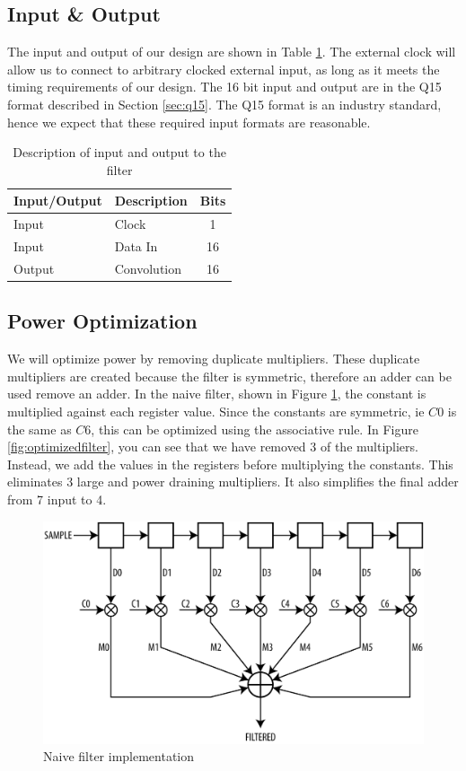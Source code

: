 \subsection{Input \& Output}
The input and output of our design are shown in Table \ref{table:inputoutput}.  The external clock will allow us to connect to arbitrary clocked external input, as long as it meets the timing requirements of our design.  The 16 bit input and output are in the Q15 format described in Section \ref{sec:q15}.  The Q15 format is an industry standard, hence we expect that these required input formats are reasonable.

\begin{table}[ht]
\centering
\begin{tabular}{l | l | c}
\hline
Input/Output & Description & Bits \\
\hline \hline
Input & Clock & 1 \\
Input & Data In & 16 \\
Output & Convolution & 16 \\
\end{tabular}
\caption{Description of input and output to the filter}
\label{table:inputoutput}
\end{table}



\subsection{Power Optimization}

We will optimize power by removing duplicate multipliers.  These duplicate multipliers are created because the filter is symmetric, therefore an adder can be used remove an adder.  In the naive filter, shown in Figure \ref{fig:naivefilter}, the constant is multiplied against each register value.  Since the constants are symmetric, ie $C0$ is the same as $C6$, this can be optimized using the associative rule.  In Figure \ref{fig:optimizedfilter}, you can see that we have removed 3 of the multipliers.  Instead, we add the values in the registers before multiplying the constants.  This eliminates 3 large and power draining multipliers.  It also simplifies the final adder from 7 input to 4.


\begin{figure}[ht]
\centering
\includegraphics[width=5in]{images/filter_normal}
\caption{Naive filter implementation}
\label{fig:naivefilter}
\end{figure}

